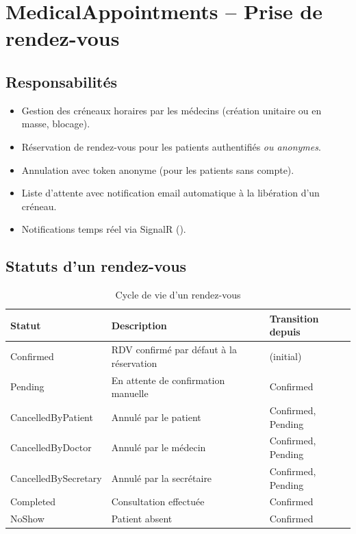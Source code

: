 \section{MedicalAppointments -- Prise de rendez-vous}

\subsection{Responsabilités}
\begin{itemize}[itemsep=3pt]
  \item Gestion des créneaux horaires par les médecins (création unitaire ou en masse, blocage).
  \item Réservation de rendez-vous pour les patients authentifiés \emph{ou anonymes}.
  \item Annulation avec token anonyme (pour les patients sans compte).
  \item Liste d'attente avec notification email automatique à la libération d'un créneau.
  \item Notifications temps réel via SignalR ().
\end{itemize}

\subsection{Statuts d'un rendez-vous}

\begin{table}[H]
\centering
\renewcommand{\arraystretch}{1.3}
\begin{tabular}{|l|l|l|}
\hline
\rowcolor{tabhead}\color{white}\textbf{Statut} &
\color{white}\textbf{Description} &
\color{white}\textbf{Transition depuis} \\
\hline
Confirmed & RDV confirmé par défaut à la réservation & (initial) \\
\rowcolor{roweven}
Pending & En attente de confirmation manuelle & Confirmed \\
CancelledByPatient & Annulé par le patient & Confirmed, Pending \\
\rowcolor{roweven}
CancelledByDoctor & Annulé par le médecin & Confirmed, Pending \\
CancelledBySecretary & Annulé par la secrétaire & Confirmed, Pending \\
\rowcolor{roweven}
Completed & Consultation effectuée & Confirmed \\
NoShow & Patient absent & Confirmed \\
\hline
\end{tabular}
\caption{Cycle de vie d'un rendez-vous}
\end{table}

